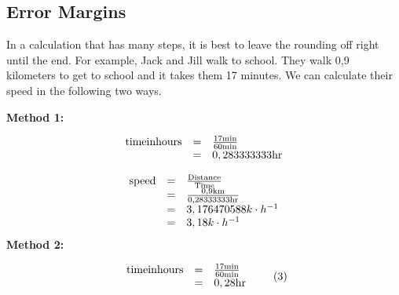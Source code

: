             \subsection*{Error Margins}
            \nopagebreak
        \label{m30853*id64160}In a calculation that has many steps, it is best to leave the rounding off right until the end.
For example, Jack and Jill walk to school. They walk 0,9 kilometers to get to school and it takes them 17 minutes. We can calculate their speed in the following two ways.\par 
        \label{m30853*id64166}\textbf{Method 1:}
          \label{m30853*id64177}\nopagebreak\noindent{}
            
    \begin{equation}
    \begin{array}{ccc}\hfill \text{time}\text{in}\text{hours}& =& \frac{17\text{min}}{60\text{min}}\hfill \\ & =& 0,283333333\text{hr}\hfill \end{array}
      \end{equation}
\label{m30853*id64327}\nopagebreak\noindent{}
            
    \begin{equation}
    \begin{array}{ccc}\hfill \text{speed}& =& \frac{\text{Distance}}{\text{Time}}\hfill \\ & =& \frac{0,9\text{km}}{0,28333333\text{hr}}\hfill \\ & =& 3,176470588k\ensuremath{\cdot}{h}^{-1}\hfill \\ & =& 3,18k\ensuremath{\cdot}{h}^{-1}\hfill \end{array}
      \end{equation}
          \textbf{Method 2:}
          \label{m30853*id64256}\nopagebreak\noindent{}
            
    \begin{equation}
    \begin{array}{ccc}\hfill \text{time}\text{in}\text{hours}& =& \frac{17\text{min}}{60\text{min}}\hfill \\ & =& 0,28\text{hr}\hfill \end{array}\tag{3}
      \end{equation}
          \label{m30853*id64461}\nopagebreak\noindent{}
            
